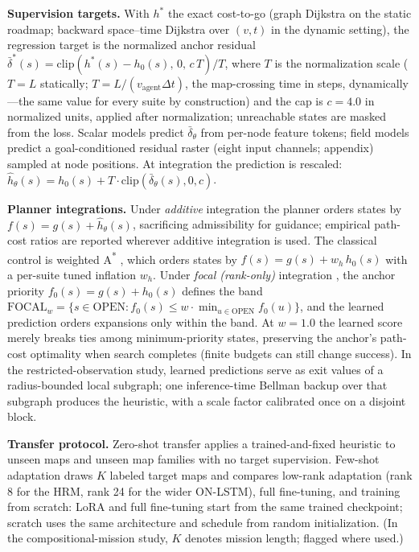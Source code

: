 \documentclass[letterpaper]{article} %
\begin{document}
\textbf{Supervision targets.} With $h^{*}$ the exact cost-to-go (graph Dijkstra on the static roadmap; backward space--time Dijkstra over $(v,t)$ in the dynamic setting), the regression target is the normalized anchor residual $\bar\delta^{*}(s) = \mathrm{clip}\!\left(h^{*}(s) - h_0(s),\, 0,\, c\,T\right)/T$, where $T$ is the normalization scale ($T{=}L$ statically; $T = L/(v_{\mathrm{agent}}\Delta t)$, the map-crossing time in steps, dynamically---the same value for every suite by construction) and the cap is $c{=}4.0$ in normalized units, applied after normalization; unreachable states are masked from the loss. Scalar models predict $\bar\delta_\theta$ from per-node feature tokens; field models predict a goal-conditioned residual raster (eight input channels; appendix) sampled at node positions. At integration the prediction is rescaled: $\hat h_\theta(s) = h_0(s) + T \cdot \mathrm{clip}(\bar\delta_\theta(s), 0, c)$.

\textbf{Planner integrations.} Under \emph{additive} integration the planner orders states by $f(s) = g(s) + \hat h_\theta(s)$, sacrificing admissibility for guidance; empirical path-cost ratios are reported wherever additive integration is used. The classical control is weighted A\textsuperscript{*} \citep{pohl1970}, which orders states by $f(s) = g(s) + w_h\, h_0(s)$ with a per-suite tuned inflation $w_h$. Under \emph{focal (rank-only)} integration \citep{pohl1970,pearl1982semiadmissible}, the anchor priority $f_0(s) = g(s) + h_0(s)$ defines the band $\mathrm{FOCAL}_w = \{ s \in \mathrm{OPEN} : f_0(s) \leq w \cdot \min_{u \in \mathrm{OPEN}} f_0(u) \}$, and the learned prediction orders expansions only within the band. At $w{=}1.0$ the learned score merely breaks ties among minimum-priority states, preserving the anchor's path-cost optimality when search completes (finite budgets can still change success). In the restricted-observation study, learned predictions serve as exit values of a radius-bounded local subgraph; one inference-time Bellman backup over that subgraph produces the heuristic, with a scale factor calibrated once on a disjoint block.

\textbf{Transfer protocol.} Zero-shot transfer applies a trained-and-fixed heuristic to unseen maps and unseen map families with no target supervision. Few-shot adaptation draws $K$ labeled target maps and compares low-rank adaptation \citep[LoRA;][]{hu2021lora} (rank 8 for the HRM, rank 24 for the wider ON-LSTM), full fine-tuning, and training from scratch: LoRA and full fine-tuning start from the same trained checkpoint; scratch uses the same architecture and schedule from random initialization. (In the compositional-mission study, $K$ denotes mission length; flagged where used.)
\end{document}

